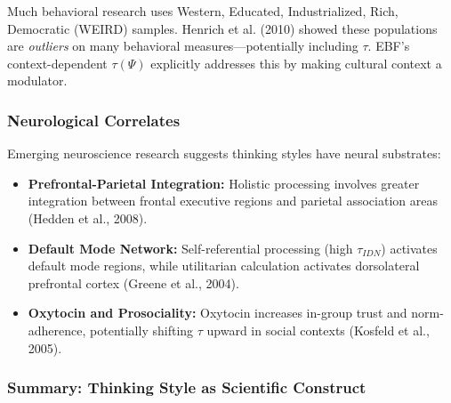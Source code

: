 \begin{note}
Much behavioral research uses Western, Educated, Industrialized, Rich, Democratic (WEIRD) samples. Henrich et al. (2010) showed these populations are \textit{outliers} on many behavioral measures—potentially including $\tau$. EBF's context-dependent $\tau(\Psi)$ explicitly addresses this by making cultural context a modulator.
\end{note}

\subsubsection{Neurological Correlates}

Emerging neuroscience research suggests thinking styles have neural substrates:

\begin{itemize}
\item \textbf{Prefrontal-Parietal Integration:} Holistic processing involves greater integration between frontal executive regions and parietal association areas (Hedden et al., 2008).

\item \textbf{Default Mode Network:} Self-referential processing (high $\tau_{IDN}$) activates default mode regions, while utilitarian calculation activates dorsolateral prefrontal cortex (Greene et al., 2004).

\item \textbf{Oxytocin and Prosociality:} Oxytocin increases in-group trust and norm-adherence, potentially shifting $\tau$ upward in social contexts (Kosfeld et al., 2005).
\end{itemize}

\subsubsection{Summary: Thinking Style as Scientific Construct}

